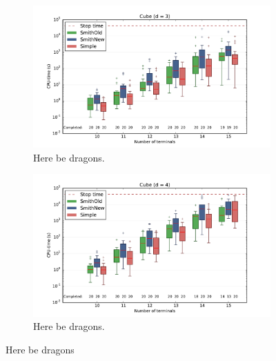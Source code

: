 \begin{figure}[htbp]
  \centering
  \begin{subfigure}[t]{0.5\textwidth}
    \includegraphics[width=\textwidth]{gfx/boxplots/plot_nvst_boxplot_d3_Cube_1}
  \caption{Here be dragons.\label{fig:boxplot-d3-cube-1}}
  \end{subfigure}%
  \begin{subfigure}[t]{0.5\textwidth}
    \includegraphics[width=\textwidth]{gfx/boxplots/plot_nvst_boxplot_d4_Cube_1}
  \caption{Here be dragons.\label{fig:boxplot-d3-cube-1}}
  \end{subfigure}%
  \caption[Here be dragons]{Here be dragons\label{fig:boxplot-cube-1}}
\end{figure}

